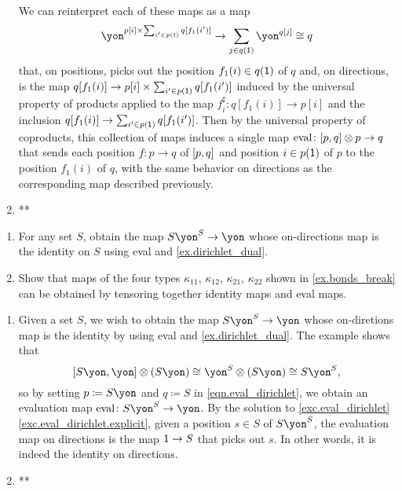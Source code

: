 \documentclass[Book-Poly]{subfiles}
\begin{document}
\begin{exercise}
\begin{solution}
\begin{enumerate}
    We can reinterpret each of these maps as a map
    \[
        \yon^{p[i] \times \sum_{i' \in p(\1)} q[f_1(i')]} \to \sum_{j \in q(\1)} \yon^{q[j]} \iso q
    \]
    that, on positions, picks out the position $f_1(i) \in q(\textsf{1})$ of $q$ and, on directions, is the map $q[f_1(i)] \to p[i] \times \sum_{i' \in p(\textsf{1})} q[f_1(i')]$ induced by the universal property of products applied to the map $f^\sharp_i \colon q[f_1(i)] \to p[i]$ and the inclusion $q[f_1(i)] \to \sum_{i' \in p(\textsf{1})} q[f_1(i')]$.
    Then by the universal property of coproducts, this collection of maps induces a single map $\mathrm{eval} \colon [p, q] \otimes p \to q$ that sends each position $f \colon p \to q$ of $[p,q]$ and position $i \in p(\textsf{1})$ of $p$ to the position $f_1(i)$ of $q$, with the same behavior on directions as the corresponding map described previously.
    \item **
\end{enumerate}
\end{solution}
\end{exercise}

\begin{exercise}
\begin{enumerate}
	\item For any set $S$, obtain the map $S\yon^S\to\yon$ whose on-directions map is the identity on $S$ using eval and \cref{ex.dirichlet_dual}.
	\item Show that maps of the four types $\kappa_{11}$, $\kappa_{12}$, $\kappa_{21}$, $\kappa_{22}$ shown in \cref{ex.bonds_break} can be obtained by tensoring together identity maps and eval maps.
\qedhere
\end{enumerate}
\begin{solution}
\begin{enumerate}
    \item Given a set $S$, we wish to obtain the map $S\yon^S \to \yon$ whose on-diretions map is the identity by using eval and \cref{ex.dirichlet_dual}.
    The example shows that
    \[
        \ihom{S\yon, \yon} \otimes (S\yon) \iso \yon^S \otimes (S\yon) \iso S\yon^S,
    \]
    so by setting $p \coloneqq S\yon$ and $q \coloneqq S$ in \eqref{eqn.eval_dirichlet}, we obtain an evaluation map $\fun{eval} \colon S\yon^S \to \yon$.
    By the solution to \cref{exc.eval_dirichlet} \cref{exc.eval_dirichlet.explicit}, given a position $s \in S$ of $S\yon^S$, the evaluation map on directions is the map $\textsf{1} \to S$ that picks out $s$.
    In other words, it is indeed the identity on directions.
    \item **
\end{enumerate}
\end{solution}
\end{exercise}
\end{document}
